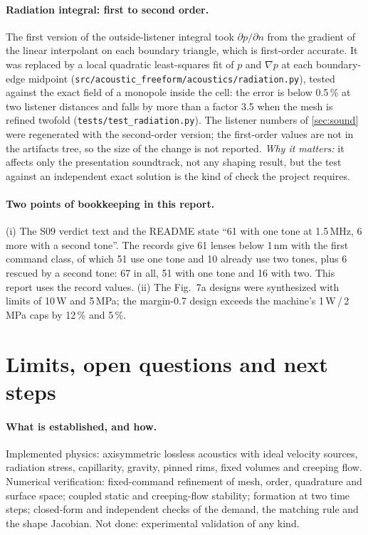 \documentclass[11pt,a4paper]{article}
\numberwithin{equation}{section}
\newcommand{\file}[1]{\nolinkurl{#1}}
\begin{document}
\paragraph{Radiation integral: first to second order.} The first version of the
outside-listener integral took $\partial p/\partial n$ from the gradient of the
linear interpolant on each boundary triangle, which is first-order accurate. It
was replaced by a local quadratic least-squares fit of $p$ and $\nabla p$ at each
boundary-edge midpoint (\file{src/acoustic_freeform/acoustics/radiation.py}),
tested against the exact field of a monopole inside the cell: the error is below
0.5\,\% at two listener distances and falls by more than a factor 3.5 when the
mesh is refined twofold (\file{tests/test_radiation.py}). The listener numbers of
\cref{sec:sound} were regenerated with the second-order version; the first-order
values are not in the artifacts tree, so the size of the change is not reported.
\emph{Why it matters:} it affects only the presentation soundtrack, not any
shaping result, but the test against an independent exact solution is the kind
of check the project requires.

\paragraph{Two points of bookkeeping in this report.} (i) The S09 verdict text and
the README state \enquote{61 with one tone at 1.5\,MHz, 6 more with a second
tone}. The records give 61 lenses below 1\,nm with the first command class, of
which 51 use one tone and 10 already use two tones, plus 6 rescued by a second
tone: 67 in all, 51 with one tone and 16 with two. This report uses the record
values. (ii) The Fig.~7a designs were synthesized with limits of 10\,W and
5\,MPa; the margin-0.7 design exceeds the machine's 1\,W\,/\,2\,MPa caps by 12\,\%
and 5\,\%.

\section{Limits, open questions and next steps}\label{sec:limits}

\paragraph{What is established, and how.} Implemented physics: axisymmetric
lossless acoustics with ideal velocity sources, radiation stress, capillarity,
gravity, pinned rims, fixed volumes and creeping flow. Numerical verification:
fixed-command refinement of mesh, order, quadrature and surface space; coupled
static and creeping-flow stability; formation at two time steps; closed-form and
independent checks of the demand, the matching rule and the shape Jacobian. Not
done: experimental validation of any kind.
\end{document}
